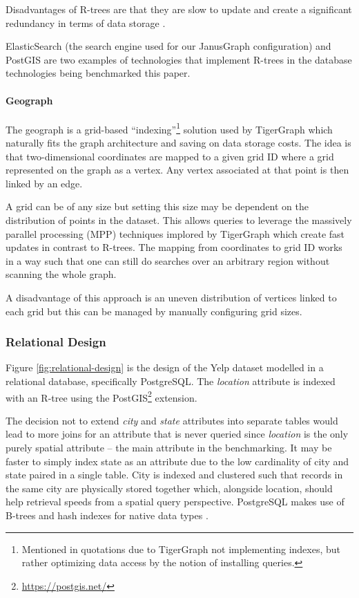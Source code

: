 Disadvantages of R-trees are that they are slow to update and create a significant redundancy in terms of data storage \cite{graphgurus}.

ElasticSearch (the search engine used for our JanusGraph configuration) and PostGIS are two examples of technologies that implement R-trees in the database technologies being benchmarked this paper.

\paragraph{Geograph}

The geograph is a grid-based ``indexing''\footnote{Mentioned in quotations due to TigerGraph not implementing indexes, but rather optimizing data access by the notion of installing queries.} solution used by TigerGraph which naturally fits the graph architecture and saving on data storage costs. The idea is that two-dimensional coordinates are mapped to a given grid ID where a grid represented on the graph as a vertex. Any vertex associated at that point is then linked by an edge.

A grid can be of any size but setting this size may be dependent on the distribution of points in the dataset. This allows queries to leverage the massively parallel processing (MPP) techniques implored by TigerGraph which create fast updates in contrast to R-trees. The mapping from coordinates to grid ID works in a way such that one can still do searches over an arbitrary region without scanning the whole graph.

A disadvantage of this approach is an uneven distribution of vertices linked to each grid but this can be managed by manually configuring grid sizes.

\subsubsection{Relational Design}
\label{subsub:relational-design}

Figure \ref{fig:relational-design} is the design of the Yelp dataset modelled in a relational database, specifically PostgreSQL. The \emph{location} attribute is indexed with an R-tree using the PostGIS\footnote{\url{https://postgis.net/}} extension.

The decision not to extend \emph{city} and \emph{state} attributes into separate tables would lead to more joins for an attribute that is never queried since \emph{location} is the only purely spatial attribute -- the main attribute in the benchmarking. It may be faster to simply index state as an attribute due to the low cardinality of city and state paired in a single table. City is indexed and clustered such that records in the same city are physically stored together which, alongside location, should help retrieval speeds from a spatial query perspective. PostgreSQL makes use of B-trees and hash indexes for native data types \cite{post-vs-mysql}.

